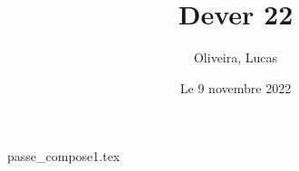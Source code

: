 \documentclass{article}
\title{Dever 22}
\author{Oliveira, Lucas}
\date{Le 9 novembre 2022}
\begin{document}
    \maketitle

    {passe_compose1.tex}
    
\end{document}
